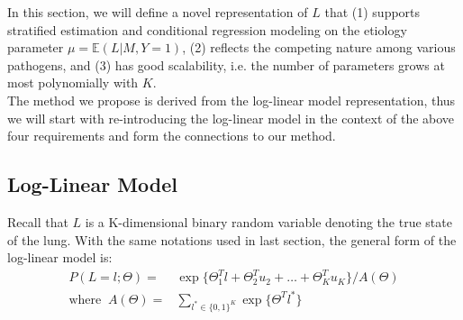 \documentclass[11 pt, a4paper]{article}  %
\begin{document}
In this section, we will define a novel representation of $L$ that (1) supports stratified estimation and conditional regression modeling on the etiology parameter $\mu=\mathbb{E}(L|M,Y=1)$, (2) reflects the competing nature among various pathogens, and (3) has good scalability, i.e. the number of parameters grows at most polynomially with $K$.\\

The method we propose is derived from the log-linear model representation, thus we will start with re-introducing the log-linear model in the context of the above four requirements and form the connections to our method.

\subsection{Log-Linear Model}
Recall that $L$ is a K-dimensional binary random variable denoting the true state of the lung. With the same notations used in last section, the general form of the log-linear model is:
\begin{align*}
P(L=l; \Theta) = & \exp \{\Theta_1^T l + \Theta_2^{T} u_2 + \ldots + \Theta_K^T u_K\}/ A(\Theta) \\
\text{where }\ 
A(\Theta) = & \sum_{l^* \in \{0,1\}^K}\exp \{ \Theta^T l^*\}
\end{align*}
\\
\end{document}
